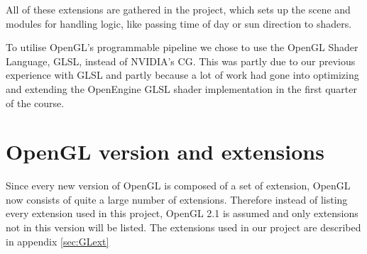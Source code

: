 All of these extensions are gathered in the  project,
which sets up the scene and modules for handling logic, like passing
time of day or sun direction to shaders.


To utilise OpenGL's programmable pipeline we chose to use the OpenGL
Shader Language, GLSL, instead of NVIDIA's CG. This was partly due to
our previous experience with GLSL and partly because a lot of work had
gone into optimizing and extending the OpenEngine GLSL shader
implementation in the first quarter of the course.

\section{OpenGL version and extensions}

Since every new version of OpenGL is composed of a set of extension,
OpenGL now consists of quite a large number of extensions. Therefore
instead of listing every extension used in this project, OpenGL 2.1 is
assumed and only extensions not in this version will be listed. The
extensions used in our project are described in appendix
\ref{sec:GLext}

